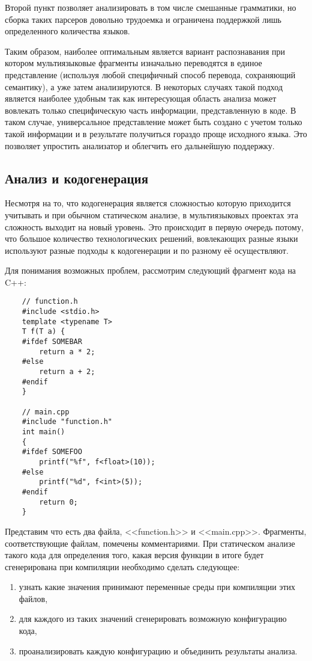 Второй пункт позволяет анализировать в том числе смешанные грамматики, 
но сборка таких парсеров довольно трудоемка и ограничена поддержкой лишь определенного количества языков.

Таким образом, наиболее оптимальным является вариант распознавания при котором мультиязыковые фрагменты
изначально переводятся в единое представление (используя любой специфичный способ перевода, сохраняющий семантику), а
уже затем анализируются. В некоторых случаях такой подход является наиболее удобным так как
интересующая область анализа может вовлекать только специфическую часть информации, представленную в коде.
В таком случае, универсальное представление может быть создано с учетом только такой информации и
в результате получиться гораздо проще исходного языка. Это позволяет упростить анализатор и облегчить его
дальнейшую поддержку.

\subsection{Анализ и кодогенерация}

Несмотря на то, что кодогенерация является сложностью которую приходится учитывать и при обычном
статическом анализе, в мультиязыковых проектах эта сложность выходит на новый уровень.
Это происходит в первую очередь потому, что большое количество технологических решений, вовлекающих
разные языки используют разные подходы к кодогенерации и по разному её осуществляют.

Для понимания возможных проблем, рассмотрим следующий фрагмент кода на C++:

\begin{verbatim}
    // function.h
    #include <stdio.h>
    template <typename T>
    T f(T a) {
    #ifdef SOMEBAR
        return a * 2;
    #else
        return a + 2;
    #endif
    }

    // main.cpp
    #include "function.h"
    int main()
    {
    #ifdef SOMEFOO
        printf("%f", f<float>(10));
    #else
        printf("%d", f<int>(5));
    #endif
        return 0;
    }
\end{verbatim}

Представим что есть два файла, <<function.h>> и <<main.cpp>>. Фрагменты, соответствующие файлам, помечены
комментариями. При статическом анализе такого кода для определения того, какая версия функции в итоге будет
сгенерирована при компиляции необходимо сделать следующее:
\begin{enumerate}[1)]
    \item узнать какие значения принимают переменные среды при компиляции этих файлов,
    \item для каждого из таких значений сгенерировать возможную конфигурацию кода,
    \item проанализировать каждую конфигурацию и объединить результаты анализа.
\end{enumerate}

